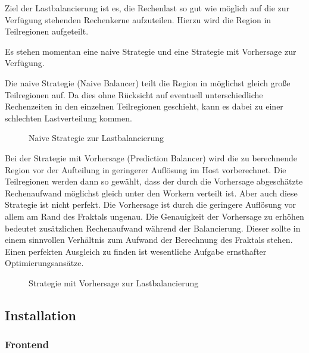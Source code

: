 Ziel der Lastbalancierung ist es, die Rechenlast so gut wie möglich auf die zur Verfügung stehenden Rechenkerne aufzuteilen. Hierzu wird die Region in Teilregionen aufgeteilt.

Es stehen momentan eine naive Strategie und eine Strategie mit Vorhersage zur Verfügung.

Die naive Strategie (Naive Balancer) teilt die Region in möglichst gleich große Teilregionen auf. Da dies ohne Rücksicht auf eventuell unterschiedliche Rechenzeiten in den einzelnen Teilregionen geschieht, kann es dabei zu einer schlechten Lastverteilung kommen.

\begin{figure}
    \centering
        \caption{Naive Strategie zur Lastbalancierung}
    \label{fig:lastbalanceriung_naiv}
\end{figure}

Bei der Strategie mit Vorhersage (Prediction Balancer) wird die zu berechnende Region vor der Aufteilung in geringerer Auflösung im Host vorberechnet. Die Teilregionen werden dann so gewählt, dass der durch die Vorhersage abgeschätzte Rechenaufwand möglichst gleich unter den Workern verteilt ist. Aber auch diese Strategie ist nicht perfekt. Die Vorhersage ist durch die geringere Auflösung vor allem am Rand des Fraktals ungenau. Die Genauigkeit der Vorhersage zu erhöhen bedeutet zusätzlichen Rechenaufwand während der Balancierung. Dieser sollte in einem sinnvollen Verhältnis zum Aufwand der Berechnung des Fraktals stehen. Einen perfekten Ausgleich zu finden ist wesentliche Aufgabe ernsthafter Optimierungsansätze.

\begin{figure}
    \centering
        \caption{Strategie mit Vorhersage zur Lastbalancierung}
    \label{fig:lastbalanceriung_vorhersage}
\end{figure}


\subsection{Installation}

\subsubsection{Frontend}

